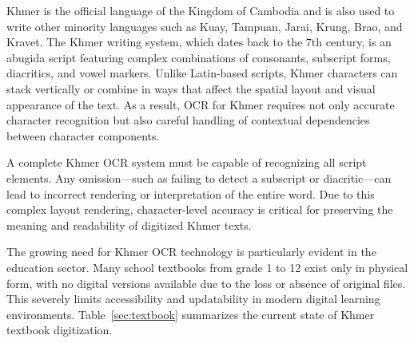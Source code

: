 Khmer is the official language of the Kingdom of Cambodia and is also used to write other minority languages such as Kuay, Tampuan, Jarai, Krung, Brao, and Kravet. The Khmer writing system, which dates back to the 7th century, is an abugida script featuring complex combinations of consonants, subscript forms, diacritics, and vowel markers. Unlike Latin-based scripts, Khmer characters can stack vertically or combine in ways that affect the spatial layout and visual appearance of the text. As a result, OCR for Khmer requires not only accurate character recognition but also careful handling of contextual dependencies between character components.

A complete Khmer OCR system must be capable of recognizing all script elements. Any omission—such as failing to detect a subscript or diacritic—can lead to incorrect rendering or interpretation of the entire word. Due to this complex layout rendering, character-level accuracy is critical for preserving the meaning and readability of digitized Khmer texts.

The growing need for Khmer OCR technology is particularly evident in the education sector. Many school textbooks from grade 1 to 12 exist only in physical form, with no digital versions available due to the loss or absence of original files. This severely limits accessibility and updatability in modern digital learning environments. Table~\ref{sec:textbook} summarizes the current state of Khmer textbook digitization.


\begin{table}[ht]
    \caption{Current State of Khmer Textbook Digitization in Cambodia's Education System}
    \vspace{10pt}
    \label{sec:textbook}
\end{table}

